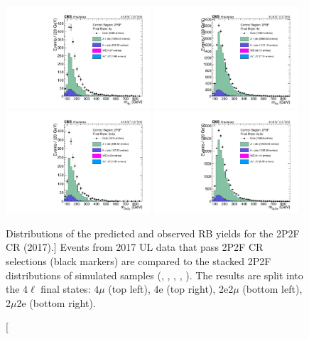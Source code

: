 \begin{figure}[!htbp]
	\begin{center}
		\includegraphics[width=0.48\textwidth]{figures/higgsmassmeas/redbkg/cr/UL2017_CR_2P2F_4mu.pdf}
		\includegraphics[width=0.48\textwidth]{figures/higgsmassmeas/redbkg/cr/UL2017_CR_2P2F_4e.pdf}
		\includegraphics[width=0.48\textwidth]{figures/higgsmassmeas/redbkg/cr/UL2017_CR_2P2F_2e2mu.pdf}
		\includegraphics[width=0.48\textwidth]{figures/higgsmassmeas/redbkg/cr/UL2017_CR_2P2F_2mu2e.pdf}
		\caption
			[Distributions of the predicted and observed RB yields for the 2P2F CR (2017).]
			{
			Events from 2017 UL data that pass 2P2F CR selections (black markers) 
			are compared to the stacked 2P2F distributions of simulated samples
			(\Zplusjets, \ttbarplusjets, \WZ, \ZZ, \Zgammastar).
			The results are split into the $4\ell$ final states:
			$4\mu$ (top left), 4e (top right), 2e2$\mu$ (bottom left), 2$\mu$2e (bottom right).
			}
		\label{cr_plots_2p2f_2017}
	\end{center}
\end{figure}
